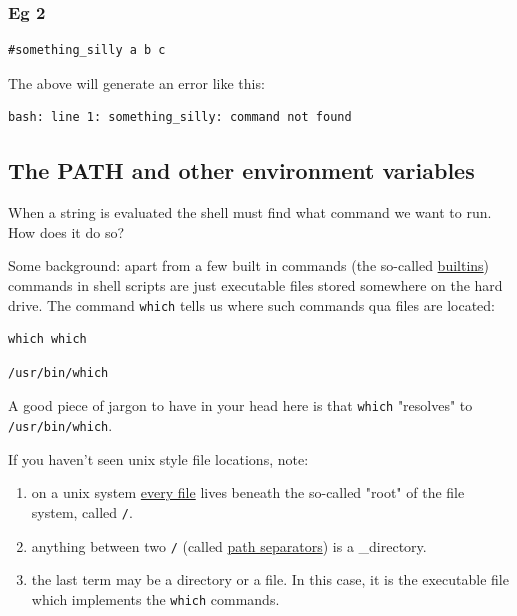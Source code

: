 \documentclass[11pt]{article}
\begin{document}
\subsubsection{Eg 2}
\label{sec:org3b1e426}

\begin{verbatim}
#something_silly a b c
\end{verbatim}

The above will generate an error like this:

\begin{verbatim}
bash: line 1: something_silly: command not found
\end{verbatim}

\subsection{The PATH and other environment variables}
\label{sec:org9d05fcc}

When a string is evaluated the shell must find what command we want to
run. How does it do so? 

Some background: apart from a few built in commands (the so-called
\href{https://www.gnu.org/software/bash/manual/html\_node/Bash-Builtins.html}{builtins}) commands in shell scripts are just executable files stored
somewhere on the hard drive.  The command \texttt{which} tells us where such
commands qua files are located:


\begin{verbatim}
which which
\end{verbatim}

\begin{verbatim}
/usr/bin/which
\end{verbatim}


A good piece of jargon to have in your head here is that \texttt{which}
"resolves" to \texttt{/usr/bin/which}.

If you haven't seen unix style file locations, note:

\begin{enumerate}
\item on a unix system \uline{every file} lives beneath the so-called "root" of
the file system, called \texttt{/}.
\item anything between two \texttt{/} (called \uline{path separators}) is a
\_directory.
\item the last term may be a directory or a file. In this case, it is the
executable file which implements the \texttt{which} commands.
\end{enumerate}
\end{document}
